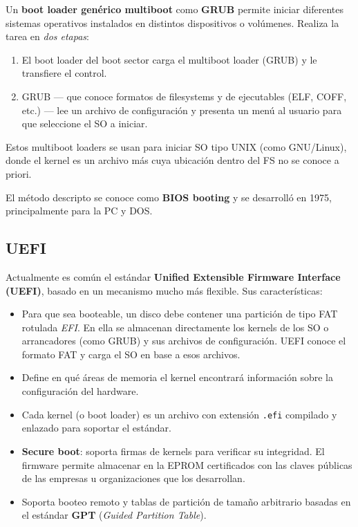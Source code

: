 \documentclass[11pt,a4paper]{article}
\begin{document}
Un \textbf{boot loader genérico multiboot} como \textbf{GRUB} permite
iniciar diferentes sistemas operativos instalados en distintos
dispositivos o volúmenes. Realiza la tarea en \emph{dos etapas}:

\begin{enumerate}[leftmargin=*]
    \item El boot loader del boot sector carga el multiboot loader
        (GRUB) y le transfiere el control.
    \item GRUB --- que conoce formatos de filesystems y de
        ejecutables (ELF, COFF, etc.) --- lee un archivo de
        configuración y presenta un menú al usuario para que
        seleccione el SO a iniciar.
\end{enumerate}

Estos multiboot loaders se usan para iniciar SO tipo UNIX (como
GNU/Linux), donde el kernel es un archivo más cuya ubicación dentro del
FS no se conoce a priori.

El método descripto se conoce como \textbf{BIOS booting} y se
desarrolló en 1975, principalmente para la PC y DOS.

\subsection{UEFI}

Actualmente es común el estándar \textbf{Unified Extensible Firmware
Interface (UEFI)}, basado en un mecanismo mucho más flexible. Sus
características:

\begin{itemize}[leftmargin=*]
    \item Para que sea booteable, un disco debe contener una partición
        de tipo FAT rotulada \emph{EFI}. En ella se almacenan
        directamente los kernels de los SO o arrancadores (como GRUB)
        y sus archivos de configuración. UEFI conoce el formato FAT y
        carga el SO en base a esos archivos.
    \item Define en qué áreas de memoria el kernel encontrará
        información sobre la configuración del hardware.
    \item Cada kernel (o boot loader) es un archivo con extensión
        \texttt{.efi} compilado y enlazado para soportar el estándar.
    \item \textbf{Secure boot}: soporta firmas de kernels para
        verificar su integridad. El firmware permite almacenar en la
        EPROM certificados con las claves públicas de las empresas u
        organizaciones que los desarrollan.
    \item Soporta booteo remoto y tablas de partición de tamaño
        arbitrario basadas en el estándar \textbf{GPT} (\emph{Guided
        Partition Table}).
\end{itemize}
\end{document}
